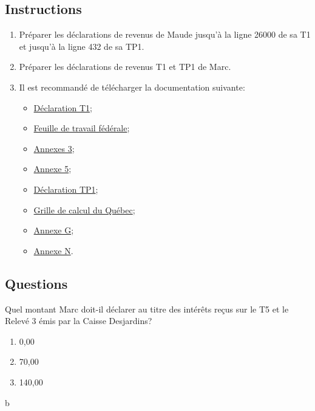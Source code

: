 \subsection{Instructions}
\begin{enumerate}
	\item Préparer les déclarations de revenus de Maude jusqu'à la ligne 26000 de sa T1 et jusqu'à la ligne 432 de sa TP1.
	\item Préparer les déclarations de revenus T1 et TP1 de Marc.
	\item Il est recommandé de télécharger la documentation suivante:
	\begin{itemize}
		\item \href{https://www.canada.ca/fr/agence-revenu/services/formulaires-publications/trousses-impot-toutes-annees-imposition/trousse-generale-impot-prestations/quebec/5005-r.html}{Déclaration T1};
		\item \href{https://www.canada.ca/fr/agence-revenu/services/formulaires-publications/trousses-impot-toutes-annees-imposition/trousse-generale-impot-prestations/5000-d1.html}{Feuille de travail fédérale};
		\item \href{https://www.canada.ca/fr/agence-revenu/services/formulaires-publications/trousses-impot-toutes-annees-imposition/trousse-generale-impot-prestations/5000-s3.html}{Annexes 3};
		\item \href{https://www.canada.ca/fr/agence-revenu/services/formulaires-publications/trousses-impot-toutes-annees-imposition/trousse-generale-impot-prestations/5000-s5.html}{Annexe 5};
		\item \href{https://www.revenuquebec.ca/documents/fr/formulaires/tp/2023-12/TP-1.D%282023-12%29.pdf}{Déclaration TP1};
		\item \href{https://www.revenuquebec.ca/documents/fr/formulaires/tp/2023-12/TP-1.D.GR%282023-12%29.pdf}{Grille de calcul du Québec};
		\item \href{https://www.revenuquebec.ca/documents/fr/formulaires/tp/2023-12/TP-1.D.G%282023-12%29.pdf}{Annexe G};
		\item \href{https://www.revenuquebec.ca/documents/fr/formulaires/tp/2023-12/TP-1.D.N%282023-12%29.pdf}{Annexe N}.
	\end{itemize}
\end{enumerate}


\subsection{Questions}
\setcounter{question}{0}
\begin{question}
	Quel montant Marc doit-il déclarer au titre des intérêts reçus sur le T5 et le Relevé 3 émis par la Caisse Desjardins?
	\begin{enumerate}[label=\alph*)]
		\item 0,00
		\item 70,00
		\item 140,00
	\end{enumerate}
\end{question}
b

